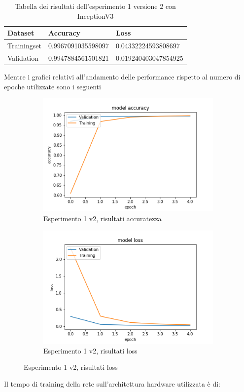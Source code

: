 \begin{table}[H]
    \begin{tabular}{|l|l|l|}
    \hline
    \textbf{Dataset}     & \textbf{Accuracy}           & \textbf{Loss}                 \\ \hline
    Trainingset & 0.9967091035598097 & 0.04332224593808697  \\ \hline
    Validation  & 0.9947884561501821 & 0.019240403047854925 \\ \hline
    \end{tabular}
   	 \caption{\label{tab:esperimento1_v2_risultati}Tabella dei risultati dell'esperimento 1 versione 2 con InceptionV3}
\end{table}

Mentre i grafici relativi all'andamento delle performance rispetto al numero di epoche utilizzate sono i seguenti
\begin{figure}[H]
    \begin{subfigure}[b]{0.5\textwidth}
        \includegraphics[width=\textwidth]{./plots/exp1_p2_acc.png}
        \caption{Esperimento 1 v2, risultati accuratezza} 
        \label{fig:plot_exp1_p2_acc}
    \end{subfigure}
    \begin{subfigure}[b]{0.5\textwidth}
        \includegraphics[width=\textwidth]{./plots/exp1_p2_loss.png}
        \caption{Esperimento 1 v2, risultati loss} 
        \label{fig:plot_exp1_p2_loss}
	\end{subfigure}
\end{figure}
Il tempo di training della rete sull'architettura hardware utilizzata è di:

